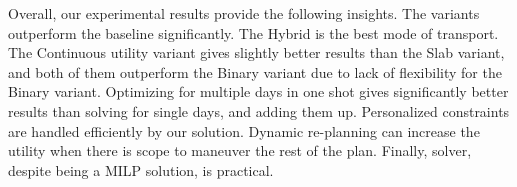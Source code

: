 Overall, our experimental results provide the following insights.
The \trip variants outperform the baseline significantly.
The Hybrid is the best mode of transport.
The Continuous utility variant gives slightly better results than the Slab variant, and both of them outperform the Binary variant due to lack of flexibility for the Binary variant.
Optimizing for multiple days in one shot gives significantly better results than solving for single days, and adding them up.
Personalized constraints are handled efficiently by our \trip solution.
Dynamic re-planning can increase the utility when there is scope to maneuver the rest of the plan.
Finally, \trip solver, despite being a MILP solution, is practical.

